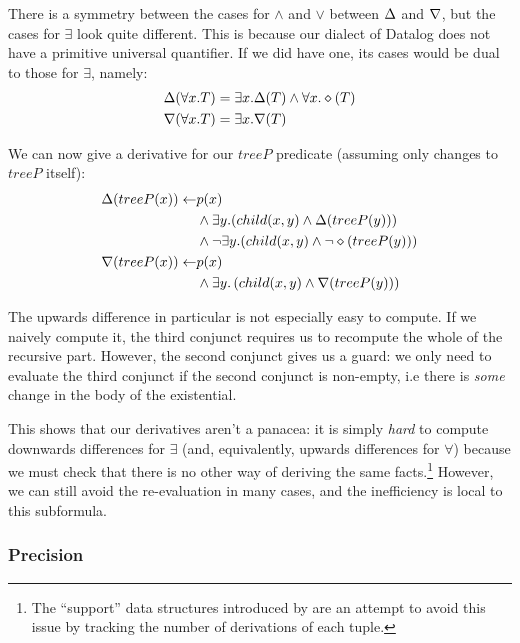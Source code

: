 There is a symmetry between the cases for $\wedge$ and $\vee$ between $\Delta$
and $\nabla$, but the cases for $\exists$ look quite different.
This is because our dialect of Datalog does not have a primitive universal quantifier.
If we did have one, its cases would be dual to those for $\exists$, namely:
\begin{align*}
\Delta(\forall x.T) &= \exists x. \Delta(T) \wedge \forall x. \diamond(T)\\
\nabla(\forall x.T) &= \exists x. \nabla(T)
\end{align*}

We can now give a derivative for our $treeP$ predicate (assuming only changes to
$treeP$ itself):
\begin{align*}
  \Delta(treeP(x)) \leftarrow & p(x)\\
    &\wedge
    \exists y. (
      child(x, y)
      \wedge
      \Delta(treeP(y))
    )\\
    &\wedge 
    \neg \exists y. (
      child(x, y)
      \wedge
      \neg \diamond(treeP(y))
    )\\
  \nabla(treeP(x)) \leftarrow & p(x)\\
  &\wedge \exists y. \left( child(x, y) \wedge \nabla(treeP(y)) \right)
\end{align*}

The upwards difference in particular is not especially easy to compute. If we naively compute it, the
third conjunct requires us to recompute the whole of the recursive part. However,
the second conjunct gives us a
guard: we only need to evaluate the third conjunct if the second conjunct is
non-empty, i.e there is \emph{some} change in the body of the existential.

This shows that our derivatives aren't a panacea: it is simply \emph{hard} to compute
downwards differences for $\exists$ (and, equivalently, upwards differences for
$\forall$) because we must check that there is no other way of deriving the same
facts.\footnote{The ``support'' data structures introduced by
  \autocite{gupta1993maintaining} are an attempt to avoid this issue by
  tracking the number of derivations of each tuple.} However, we can still avoid
the re-evaluation in many cases, and the inefficiency is local to this subformula.

\subsubsection{Precision}


